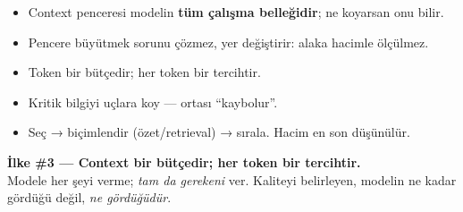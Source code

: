 \begin{itemize}
  \item Context penceresi modelin \textbf{tüm çalışma belleğidir}; ne koyarsan onu bilir.
  \item Pencere büyütmek sorunu çözmez, yer değiştirir: alaka hacimle ölçülmez.
  \item Token bir bütçedir; her token bir tercihtir.
  \item Kritik bilgiyi uçlara koy --- ortası ``kaybolur''.
  \item Seç → biçimlendir (özet/retrieval) → sırala. Hacim en son düşünülür.
\end{itemize}

\begin{principlebox}
\textbf{İlke \#3 — Context bir bütçedir; her token bir tercihtir.}\\[4pt]
\normalsize Modele her şeyi verme; \emph{tam da gerekeni} ver. Kaliteyi
belirleyen, modelin ne kadar gördüğü değil, \emph{ne gördüğüdür}.
\end{principlebox}
